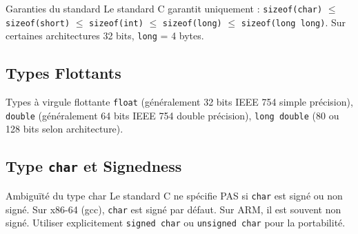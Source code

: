 \documentclass[10pt,a4paper]{article}
\begin{document}
\begin{warningbox}{Garanties du standard}
Le standard C garantit uniquement : \texttt{sizeof(char)} $\leq$ \texttt{sizeof(short)} $\leq$ \texttt{sizeof(int)} $\leq$ \texttt{sizeof(long)} $\leq$ \texttt{sizeof(long long)}. Sur certaines architectures 32 bits, \texttt{long} = 4 bytes.
\end{warningbox}

\subsection{Types Flottants}

\begin{definitionbox}{Types à virgule flottante}
\texttt{float} (généralement 32 bits IEEE 754 simple précision), \texttt{double} (généralement 64 bits IEEE 754 double précision), \texttt{long double} (80 ou 128 bits selon architecture).
\end{definitionbox}

\begin{center}
\end{center}

\subsection{Type \texttt{char} et Signedness}

\begin{warningbox}{Ambiguïté du type char}
Le standard C ne spécifie PAS si \texttt{char} est signé ou non signé. Sur x86-64 (gcc), \texttt{char} est signé par défaut. Sur ARM, il est souvent non signé. Utiliser explicitement \texttt{signed char} ou \texttt{unsigned char} pour la portabilité.
\end{warningbox}
\end{document}
